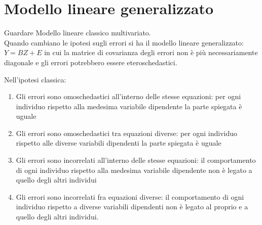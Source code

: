 \documentclass[a4page, 11pt]{article} %
\begin{document}
\section{Modello lineare generalizzato}

Guardare Modello lineare classico multivariato.\\
Quando cambiano le ipotesi sugli errori si ha il modello lineare generalizzato: $Y = BZ+E$ in cui la matrice di covarianza degli errori non è più necessariamente diagonale e gli errori potrebbero essere eteroschedastici. 

Nell’ipotesi classica:

\begin{enumerate}[noitemsep]
\item Gli errori sono omoschedastici all’interno delle stesse equazioni: per ogni individuo rispetto alla medesima variabile dipendente la parte spiegata è uguale
\item Gli errori sono omoschedastici tra equazioni diverse: per ogni individuo rispetto alle diverse variabili dipendenti la parte spiegata è uguale
\item Gli errori sono incorrelati all’interno delle stesse equazioni: il comportamento di ogni individuo rispetto alla medesima variabile dipendente non è legato a quello degli altri individui
\item Gli errori sono incorrelati fra equazioni diverse: il comportamento di ogni individuo rispetto a diverse variabili dipendenti non è legato al proprio e a quello degli altri individui.
\end{enumerate}
\end{document}
